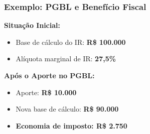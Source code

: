 \begin{frame}[t]\frametitle{Exemplo: PGBL e Benefício Fiscal}
  \textbf{Situação Inicial:}
  \begin{itemize}
    \item Base de cálculo do IR: \textbf{R\$ 100.000}
    \item Alíquota marginal de IR: \textbf{27,5\%}
  \end{itemize}

  \vspace{0.3cm}
  \textbf{Após o Aporte no PGBL:}
  \begin{itemize}
    \item Aporte: \textbf{R\$ 10.000}
    \item Nova base de cálculo: \textbf{R\$ 90.000}
    \item \textbf{Economia de imposto: R\$ 2.750}
  \end{itemize}
\end{frame}
